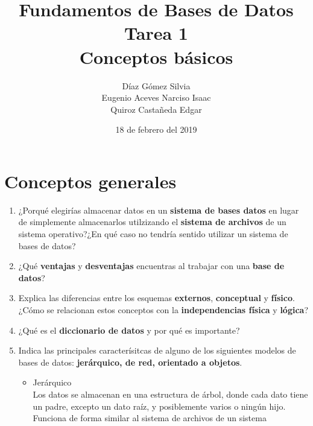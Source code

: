 \documentclass{article}
\begin{document}
    \title{Fundamentos de Bases de Datos \\
        Tarea 1 \\
        Conceptos básicos} 
    \author{Díaz Gómez Silvia \\
    Eugenio Aceves Narciso Isaac \\
    Quiroz Castañeda Edgar}
    \date{18 de febrero del 2019}
    \maketitle

    \section{Conceptos generales}

    \begin{enumerate}[label=\alph*.]
        \item {
            ¿Porqué elegirías almacenar datos en un \textbf{sistema de bases 
            datos} en lugar de simplemente almacenarlos utilzizando el 
            \textbf{sistema de archivos} de un sistema operativo?¿En qué caso no
            tendría sentido utilizar un sistema de bases de datos?
        }
        \item {
            ¿Qué \textbf{ventajas}  y \textbf{desventajas} encuentras al 
            trabajar con una \textbf{base de datos}?
        }
        \item {
            Explica las diferencias entre los esquemas \textbf{externos}, 
            \textbf{conceptual} y \textbf{físico}. ¿Cómo se relacionan estos 
            conceptos con la \textbf{independencias física} y \textbf{lógica}? 
        }
        \item {
            ¿Qué es el \textbf{diccionario de datos} y por qué es importante?
        }
        \item {
            Indica las principales caracterísitcas de alguno de los siguientes 
            modelos de bases de datos: \textbf{jerárquico, de red, orientado 
            a objetos}.
            \begin{itemize}
                \item {Jerárquico\\
                Los datos se almacenan en una estructura de árbol, donde cada 
                dato tiene un padre, excepto un dato raíz, y posiblemente varios
                o ningún hijo. \\
                Funciona de forma similar al sistema de archivos de un sistema 
}
\end{itemize}}
\end{enumerate}
\end{document}
